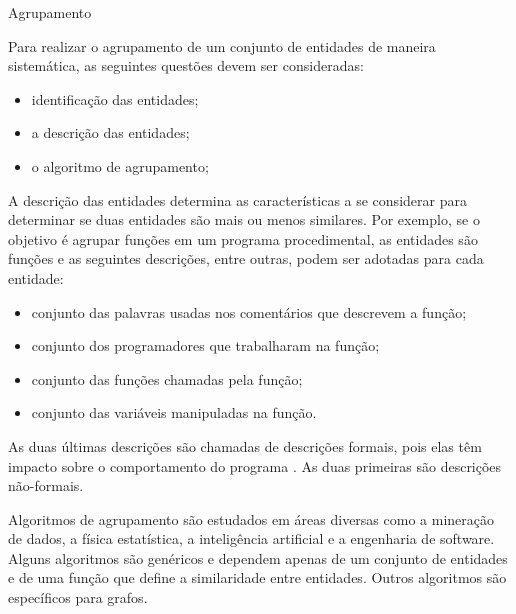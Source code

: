 \begin{section}{Agrupamento}

Para realizar o agrupamento de um conjunto de entidades de maneira sistemática, as seguintes questões devem ser consideradas:

\begin{itemize}
	\item identificação das entidades;
	\item a descrição das entidades;
	\item o algoritmo de agrupamento;
\end{itemize}

A descrição das entidades determina as características a se considerar para determinar se duas entidades são mais ou menos similares. Por exemplo, se o objetivo é agrupar funções em um programa procedimental, as entidades são funções e as seguintes descrições, entre outras, podem ser adotadas para cada entidade:

\begin{itemize}
	\item conjunto das palavras usadas nos comentários que descrevem a função;
	\item conjunto dos programadores que trabalharam na função;
	\item conjunto das funções chamadas pela função;
	\item conjunto das variáveis manipuladas na função.
\end{itemize}

As duas últimas descrições são chamadas de descrições formais, pois elas têm impacto sobre o comportamento do programa \cite{Anquetil1999}. As duas primeiras são descrições não-formais. 

Algoritmos de agrupamento são estudados em áreas diversas como a mineração de dados, a física estatística, a inteligência artificial e a engenharia de software. Alguns algoritmos são genéricos e dependem apenas de um conjunto de entidades e de uma função que define a similaridade entre entidades. Outros algoritmos são específicos para grafos.

\end{section}

